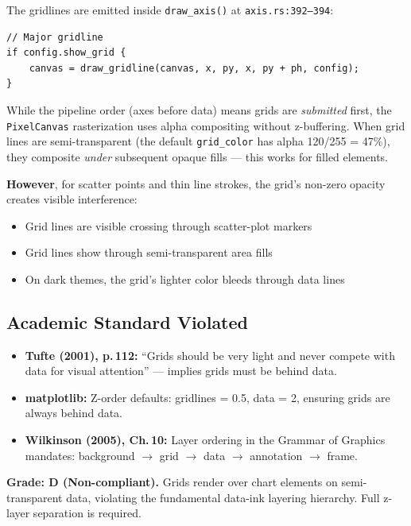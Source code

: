 \documentclass[11pt,a4paper]{article}
\begin{document}
The gridlines are emitted inside \texttt{draw\_axis()} at \texttt{axis.rs:392--394}:

\begin{lstlisting}[firstnumber=391]
// Major gridline
if config.show_grid {
    canvas = draw_gridline(canvas, x, py, x, py + ph, config);
}
\end{lstlisting}

While the pipeline order (axes before data) means grids are \emph{submitted}
first, the \texttt{PixelCanvas} rasterization uses alpha compositing without
z-buffering. When grid lines are semi-transparent (the default
\texttt{grid\_color} has alpha 120/255 = 47\%), they composite \emph{under}
subsequent opaque fills — this works for filled elements.

\textbf{However}, for scatter points and thin line strokes, the grid's
non-zero opacity creates visible interference:

\begin{itemize}[nosep]
  \item Grid lines are visible crossing through scatter-plot markers
  \item Grid lines show through semi-transparent area fills
  \item On dark themes, the grid's lighter color bleeds through data lines
\end{itemize}

\subsection{Academic Standard Violated}
\begin{itemize}[nosep]
  \item \textbf{Tufte (2001), p.\,112:} ``Grids should be very light and
        never compete with data for visual attention'' — implies grids must
        be behind data.
  \item \textbf{matplotlib:} Z-order defaults: gridlines = 0.5, data = 2,
        ensuring grids are always behind data.
  \item \textbf{Wilkinson (2005), Ch.\,10:} Layer ordering in the Grammar of
        Graphics mandates: background $\to$ grid $\to$ data $\to$ annotation $\to$
        frame.
\end{itemize}

\begin{criticalbox}
\textbf{Grade: D (Non-compliant).} Grids render over chart elements on
semi-transparent data, violating the fundamental data-ink layering hierarchy.
Full z-layer separation is required.
\end{criticalbox}
\end{document}
